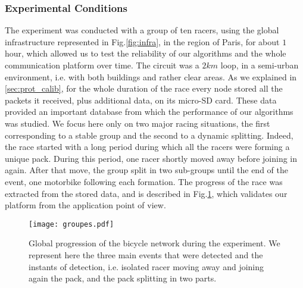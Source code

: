 \documentclass{sig-alternate}
\begin{document}
\subsubsection{Experimental Conditions}
The experiment was conducted with a group of ten racers, using the global infrastructure represented in Fig.\ref{fig:infra}, in the region of Paris, for about $1$ hour, which allowed us to test the reliability of our algorithms and the whole communication platform over time. The circuit was a $2 km$ loop, in a semi-urban environment, i.e. with both buildings and rather clear areas. As we explained in \ref{sec:prot_calib}, for the whole duration of the race every node stored all the packets it received, plus additional data, on its micro-SD card. These data provided an important database from which the performance of our algorithms was studied. We focus here only on two major racing situations, the first corresponding to a stable group and the second to a dynamic splitting. Indeed, the race started with a long period during which all the racers were forming a unique pack. During this period, one racer shortly moved away before joining in again. After that move, the group split in two sub-groups until the end of the event, one motorbike following each formation. The progress of the race was extracted from the stored data, and is described in Fig.\ref{fig:prog_expe}, which validates our platform from the application point of view.

\begin{figure}[t]
\centering
\texttt{[image: groupes.pdf]}
\caption{Global progression of the bicycle network during the experiment. We represent here the three main events that were detected and the instants of detection, i.e. isolated racer moving away and joining again the pack, and the pack splitting in two parts.}
\label{fig:prog_expe}
\end{figure}
\end{document}

